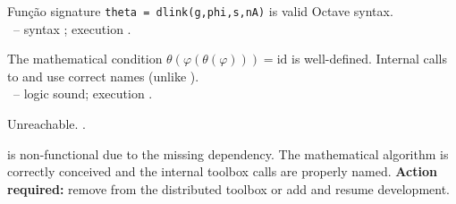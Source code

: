 \begin{tcolorbox}[Pbox,title={TC2 -- Syntactic validity}]
Função signature \lstinline|theta = dlink(g,phi,s,nA)| is valid Octave syntax.\\
\NOTA\ -- syntax \APROVADO; execution \FALHOU.
\end{tcolorbox}
\begin{tcolorbox}[Pbox,title={TC3--TC4 -- Algoritmo and internal calls}]
The mathematical condition $\theta(\varphi(\theta(\varphi)))=\mathrm{id}$ is well-defined. Internal calls to  and  use correct names (unlike ).\\
\NOTA\ -- logic sound; execution \FALHOU.
\end{tcolorbox}
\begin{tcolorbox}[Fbox,title={TC5 -- Desempenho}]
Unreachable. \FALHOU.
\end{tcolorbox}
\begin{concl}
 is non-functional due to the missing  dependency. The mathematical algorithm is correctly conceived and the internal toolbox calls are properly named. \textbf{Action required:} remove from the distributed toolbox or add  and resume development.
\end{concl}

